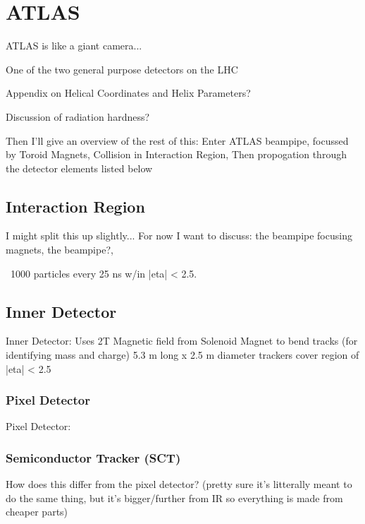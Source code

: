 
\chapter{ATLAS}
    ATLAS is like a giant camera...

    One of the two general purpose detectors on the LHC

    Appendix on Helical Coordinates and Helix Parameters?

    Discussion of radiation hardness?

    Then I'll give an overview of the rest of this:
        Enter ATLAS beampipe,
        focussed by Toroid Magnets,
        Collision in Interaction Region,
        Then propogation through the detector elements listed below



\section{Interaction Region}
    I might split this up slightly... For now I want to discuss:
        the beampipe focusing magnets,
        the beampipe?,

    ~1000 particles every 25 ns w/in |eta| < 2.5.



\section{Inner Detector}
    Inner Detector:
        Uses 2T Magnetic field from Solenoid Magnet to bend tracks (for identifying mass and charge)
        5.3 m long x 2.5 m diameter
        trackers cover region of |eta| < 2.5


    \subsection{Pixel Detector}
        Pixel Detector:


    \subsection{Semiconductor Tracker (SCT)}
        How does this differ from the pixel detector? (pretty sure it's litterally meant to do the same thing, but it's bigger/further from IR so everything is made from cheaper parts)


